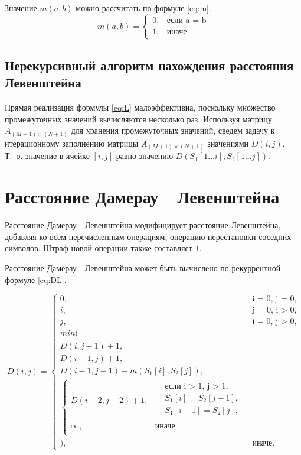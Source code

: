 Значение $ m(a, b) $ можно рассчитать по формуле \eqref{eq:m}.
\begin{equation}
	\label{eq:m}
	m(a, b) = \begin{cases}
		0, &\text{если a = b}\\
		1, &\text{иначе}
	\end{cases}
\end{equation}

\subsection{Нерекурсивный алгоритм нахождения расстояния Левенштейна}

Прямая реализация формулы \eqref{eq:L} малоэффективна, поскольку множество промежуточных значений вычисляются несколько раз. Используя матрицу $ A_{(M+1) \times (N+1)} $ для хранения промежуточных значений, сведем задачу к итерационному заполнению матрицы $ A_{(M+1) \times (N+1)} $ значениями $ D(i, j) $. Т.~о. значение в ячейке $ [i, j] $ равно значению $ D(S_1[1...i], S_2[1...j]) $.

\section{Расстояние Дамерау---Левенштейна}

Расстояние Дамерау---Левенштейна модифицирует расстояние Левенштейна, добавляя ко всем перечисленным операциям, операцию перестановки соседних символов. Штраф новой операции также составляет $ 1 $. 

Расстояние Дамерау---Левенштейна может быть вычислено по рекуррентной формуле \eqref{eq:DL}.

\begin{equation}
	\label{eq:DL}
	D(i, j) = 
	\begin{cases}
		0, &\text{i = 0, j = 0,}\\
		i, &\text{j = 0, i > 0,}\\
		j, &\text{i = 0, j > 0,}\\
		min(\\
		D(i, j - 1) + 1,\\
		D(i - 1, j) + 1,\\ 
		D(i - 1, j - 1) + m(S_{1}[i], S_{2}[j]), \\
		\begin{cases}
			D(i - 2, j - 2) + 1, & \begin{aligned}
				& \text{если i > 1, j > 1}, \\
				& S_{1}[i] = S_{2}[j - 1], \\
				& S_{1}[i - 1] = S_{2}[j], \\
			\end{aligned}\\
			\infty, & \textrm{иначе} \\
		\end{cases} \\
		), & \textrm{иначе.}
	\end{cases}
\end{equation}

